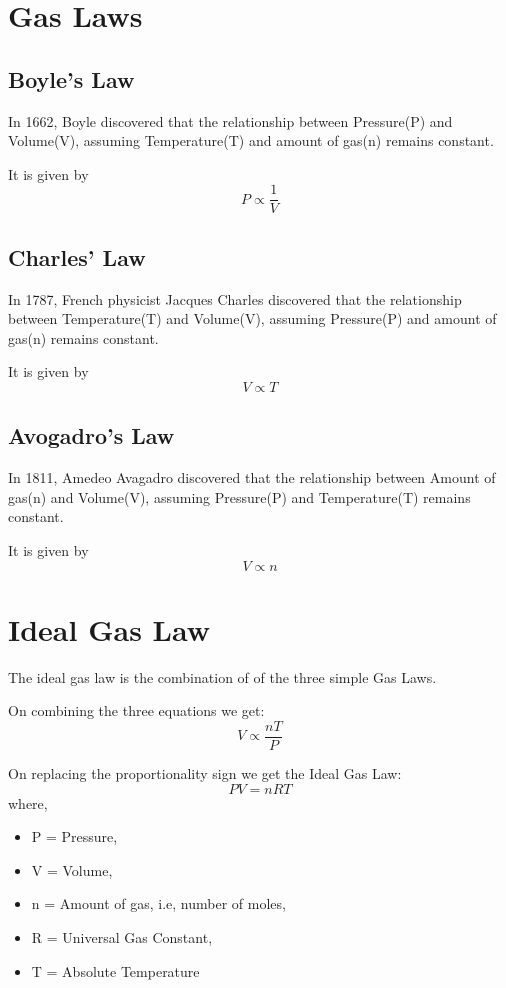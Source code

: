 \documentclass[16pt,a4paper]{article}
\begin{document}
\section {Gas Laws}
\subsection{Boyle's Law}
In 1662, Boyle discovered that the relationship between Pressure(P) and Volume(V), assuming Temperature(T) and amount of gas(n) remains constant.

It is given by
\begin{equation}
    P \propto \frac{1}{V}
\end{equation}

\subsection{Charles' Law}
In 1787, French physicist Jacques Charles discovered that the relationship between Temperature(T) and Volume(V), assuming Pressure(P) and amount of gas(n) remains constant.

It is given by
\begin{equation}
    V \propto T
\end{equation}

\subsection{Avogadro's Law}
In 1811, Amedeo Avagadro discovered that the relationship between Amount of gas(n) and Volume(V), assuming Pressure(P) and Temperature(T) remains constant.

It is given by
\begin{equation}
    V \propto n
\end{equation}

\section {Ideal Gas Law}
The ideal gas law is the combination of of the three simple Gas Laws.


On combining the three equations we get:
\begin{equation}
    V \propto \frac{nT}{P}
\end{equation}


On replacing the proportionality sign we get the Ideal Gas Law:~\cite{doi:10.1021/ed062p399.1}
\begin{equation}
   PV=nRT
\label{eq:idealgaslaw}
\end{equation}
where,
\begin{itemize}
    \item P = Pressure,
    \item V = Volume,
    \item n = Amount of gas, i.e, number of moles,
    \item R = Universal Gas Constant,
    \item T = Absolute Temperature
\end{itemize}
\end{document}
